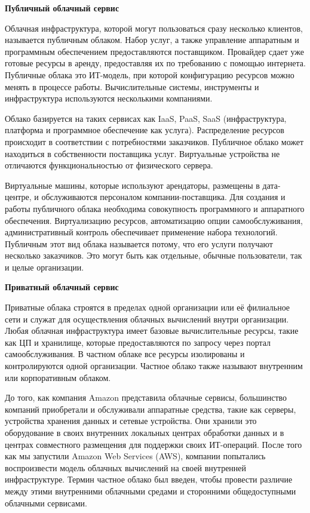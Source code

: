   \begin{center}{\bfseries Публичный облачный сервис}
  \end{center}
  Облачная инфраструктура, которой могут пользоваться сразу несколько клиентов, называется публичным облаком. Набор услуг, а также управление аппаратным и программным обеспечением предоставляются поставщиком. Провайдер сдает уже готовые ресурсы в аренду, предоставляя их по требованию с помощью интернета. Публичные облака это ИТ-модель, при которой конфигурацию ресурсов можно менять в процессе работы. Вычислительные системы, инструменты и инфраструктура используются несколькими компаниями. 

  Облако базируется на таких сервисах как IaaS, PaaS, SaaS (инфраструктура, платформа и программное обеспечение как услуга). Распределение ресурсов происходит в соответствии с потребностями заказчиков. Публичное облако может находиться в собственности поставщика услуг. Виртуальные устройства не отличаются функциональностью от физического сервера. 

  Виртуальные машины, которые используют арендаторы, размещены в дата-центре, и обслуживаются персоналом компании-поставщика. Для создания и работы публичного облака необходима совокупность программного и аппаратного обеспечения. Виртуализацию ресурсов, автоматизацию опции самообслуживания, административный контроль обеспечивает применение набора технологий. Публичным этот вид облака называется потому, что его услуги получают несколько заказчиков. Это могут быть как отдельные, обычные пользователи, так и целые организации.

  \begin{center}{\bfseries Приватный облачный сервис}
  \end{center}

  Приватные облака строятся в пределах одной организации или её филиальное сети и служат для осуществления облачных вычислений внутри организации. Любая облачная инфраструктура имеет базовые вычислительные ресурсы, такие как ЦП и хранилище, которые предоставляются по запросу через портал самообслуживания. В частном облаке все ресурсы изолированы и контролируются одной организации. Частное облако также называют внутренним или корпоративным облаком.

  До того, как компания Amazon представила облачные сервисы, большинство компаний приобретали и обслуживали аппаратные средства, такие как серверы, устройства хранения данных и сетевые устройства. Они хранили это оборудование в своих внутренних локальных центрах обработки данных и в центрах совместного размещения для поддержки своих ИТ-операций. После того как мы запустили Amazon Web Services (AWS), компании попытались воспроизвести модель облачных вычислений на своей внутренней инфраструктуре. Термин частное облако был введен, чтобы провести различие между этими внутренними облачными средами и сторонними общедоступными облачными сервисами.

